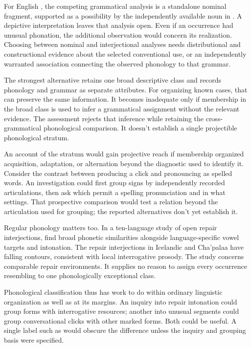 \documentclass[12pt]{article}
\begin{document}
For English , the competing grammatical analysis is a
standalone nominal fragment, supported as a possibility by the independently
available noun in . A depictive interpretation leaves
that analysis open. Even if an occurrence had unusual phonation, the
additional observation would concern its realization. Choosing between
nominal and interjectional analyses needs distributional and constructional
evidence about the selected conventional use, or an independently warranted
association connecting the observed phonology to that grammar.

The strongest alternative retains one broad descriptive class and records
phonology and grammar as separate attributes. For organizing known cases,
that can preserve the same information. It becomes inadequate only if
membership in the broad class is used to infer a grammatical assignment
without the relevant evidence. The assessment rejects
that inference while retaining the cross-grammatical phonological
comparison. It doesn't establish a single projectible phonological stratum.

An account of the stratum would gain projective reach if membership
organized acquisition, adaptation, or alternation beyond the diagnostic
used to identify it. Consider the contrast between producing a click
and pronouncing  as spelled words. An investigation
could first group signs by independently recorded articulations, then
ask which permit a spelling pronunciation and in what settings.
That prospective comparison would test a relation beyond the articulation
used for grouping; the reported alternatives don't yet establish it.

Regular phonology matters too. In a ten-language study of open repair
interjections, \textcite{dingemanse2013huh} find broad phonetic similarities
alongside language-specific vowel targets and intonation. The repair interjections in Icelandic and
Cha'palaa have falling contours, consistent with local interrogative
prosody. The study concerns comparable repair environments. It supplies
no reason to assign every occurrence resembling  to one
phonologically exceptional class.

Phonological classification thus has work to do within ordinary linguistic
organization as well as at its margins. An inquiry into repair intonation
could group forms with interrogative resources; another into unusual
segments could group conversational clicks with other marked forms.
Both could be useful. A single label such as  would obscure
the difference unless the inquiry and grouping basis were specified.
\end{document}
